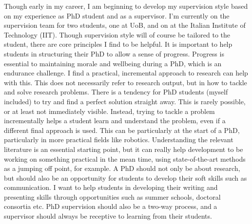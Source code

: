 \documentclass[12pt]{article}
\begin{document}
Though early in my career, I am beginning to develop my supervision style based on my experience as PhD student and as a supervisor.
%
I'm currently on the supervision team for two students, one at UoB, and on at the Italian Institute of Technology (IIT).
%
Though supervision style will of course be tailored to the student, there are core principles I find to be helpful.
%
It is important to help students in structuring their PhD to allow a sense of progress.
%
Progress is essential to maintaining morale and wellbeing during a PhD, which is an endurance challenge.
%
I find a practical, incremental approach to research can help with this.
%
This does not necessarily refer to research output, but in how to tackle and solve research problems.
%
There is a tendency for PhD students (myself included) to try and find a perfect solution straight away.
%
This is rarely possible, or at least not immediately visible.
%
Instead, trying to tackle a problem incrementally helps a student learn and understand the problem, even if a different final approach is used.
%
This can be particularly at the start of a PhD, particularly in more practical fields like robotics.
%
Understanding the relevant literature is an essential starting point, but it can really help development to be working on something practical in the mean time, using state-of-the-art methods as a jumping off point, for example.
%
A PhD should not only be about research, but should also be an opportunity for students to develop their soft skills such as communication.
%
I want to help students in developing their writing and presenting skills through opportunities such as summer schools, doctoral consortia etc.
%
PhD supervision should also be a two-way process, and a supervisor should always be receptive to learning from their students.
\end{document}
